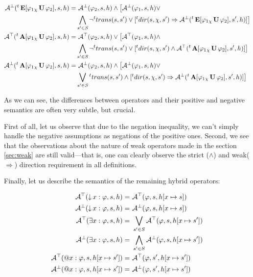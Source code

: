 \begin{align*}
	\mathcal{A}^\bot({}^{t}\operatorname{\mathbf{E}}[ \varphi_1 {}_{\chi}\operatorname{\mathbf{U}} \varphi_2], s, h) = &\ \mathcal{A}^\bot(\varphi_2, s, h) \land \big[ \mathcal{A}^\bot(\varphi_1, s, h) \lor \\
	& \bigwedge_{s' \in \mathit{S}} \neg{}^{t}trans(s,s') \lor [{}^{t}dir(s, \chi, s') \Rightarrow \mathcal{A}^\bot({}^{t}\operatorname{\mathbf{E}}[ \varphi_1 {}_{\chi}\operatorname{\mathbf{U}} \varphi_2], s', h)] \big] \\
	\mathcal{A}^\top({}^{t}\operatorname{\mathbf{A}}[ \varphi_1 {}_{\chi}\operatorname{\mathbf{U}} \varphi_2], s, h) = &\ \mathcal{A}^\top(\varphi_2, s, h) \lor \big[ \mathcal{A}^\top(\varphi_1, s, h) \land \\
	& \bigwedge_{s' \in \mathit{S}} \neg{}^{t}trans(s,s') \lor [{}^{t}dir(s, \chi, s') \land \mathcal{A}^\top({}^{t}\operatorname{\mathbf{A}}[ \varphi_1 {}_{\chi}\operatorname{\mathbf{U}} \varphi_2], s', h)] \big] \\
	\mathcal{A}^\bot({}^{t}\operatorname{\mathbf{A}}[ \varphi_1 {}_{\chi}\operatorname{\mathbf{U}} \varphi_2], s, h) = &\ \mathcal{A}^\bot(\varphi_2, s, h) \land \big[ \mathcal{A}^\bot(\varphi_1, s, h) \lor \\
	& \bigvee_{s' \in \mathit{S}} {}^{t}trans(s,s') \land [{}^{t}dir(s, \chi, s') \Rightarrow \mathcal{A}^\bot({}^{t}\operatorname{\mathbf{A}}[ \varphi_1 {}_{\chi}\operatorname{\mathbf{U}} \varphi_2], s', h)] \big] \\
\end{align*}

As we can see, the differences between operators and their positive and negative semantics are often very subtle, but crucial.

First of all, let us observe that due to the negation inequality, we can't simply handle the negative assumptions as negations of the positive ones. Second, we see that the observations about the nature of weak operators made in the section \ref{sec:weak} are still valid—that is, one can clearly observe the strict ($\land$) and weak($\Rightarrow$) direction requirement in all definitions.

Finally, let us describe the semantics of the remaining hybrid operators:

\begin{align*}
	\mathcal{A}^\top(\operatorname{\downarrow} x : \varphi, s, h) = &\ \mathcal{A}^\top(\varphi, s, h[x \mapsto s]) \\
	\mathcal{A}^\bot(\operatorname{\downarrow} x : \varphi, s, h) = &\ \mathcal{A}^\bot(\varphi, s, h[x \mapsto s]) \\
	\mathcal{A}^\top(\exists x : \varphi, s, h) = &\ \bigvee_{s' \in S} \mathcal{A}^\top(\varphi, s, h[x \mapsto s']) \\
	\mathcal{A}^\bot(\exists x : \varphi, s, h) = &\ \bigwedge_{s' \in S} \mathcal{A}^\bot(\varphi, s, h[x \mapsto s']) \\
	\mathcal{A}^\top(\operatorname{@\!} x : \varphi, s, h[x \mapsto s']) = &\ \mathcal{A}^\top(\varphi, s', h[x \mapsto s']) \\
	\mathcal{A}^\bot(\operatorname{@\!} x : \varphi, s, h[x \mapsto s']) = &\ \mathcal{A}^\bot(\varphi, s', h[x \mapsto s']) \\
\end{align*}

